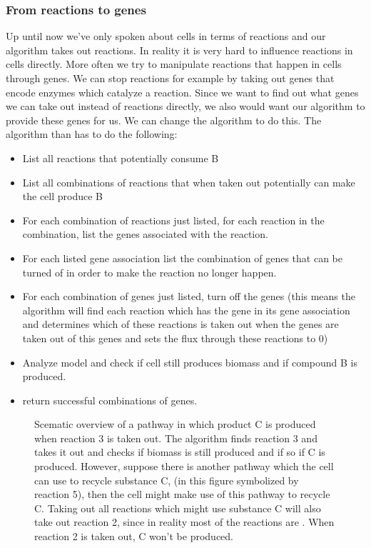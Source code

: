 \documentclass[10pt]{report}
\begin{document}
\subsubsection{From reactions to genes}
Up until now we've only spoken about cells in terms of reactions and our algorithm takes out reactions. In reality it is very hard to influence reactions in cells directly. More often we try to manipulate reactions that happen in cells through genes. We can stop reactions for example by taking out genes that encode enzymes which catalyze a reaction. Since we want to find out what genes we can take out instead of reactions directly, we also would want our algorithm to provide these genes for us. We can change the algorithm to do this.
The algorithm than has to do the following:
\begin{itemize}
\item List all reactions that potentially consume B
\item List all combinations of reactions that when taken out potentially can make the cell produce B
\item For each combination of reactions just listed, for each reaction in the combination, list the genes associated with the reaction.
\item For each listed gene association list the combination of genes that can be turned of in order to make the reaction no longer happen.
\item For each combination of genes just listed, turn off the genes (this means the algorithm will find each reaction which has the gene in its gene association and determines which of these reactions is taken out when the genes are taken out of this genes and sets the flux through these reactions to 0)
\item Analyze model and check if cell still produces biomass and if compound B is produced.
\item return successful combinations of genes.
\end{itemize}


\begin{figure}[hbtp]
  \centering
     
      \caption{Scematic overview of a pathway in which product C is produced when reaction 3 is taken out. The algorithm finds reaction 3 and takes it out and checks if biomass is still produced and if so if C is produced. However, suppose there is another pathway which the cell can use to recycle substance C, (in this figure symbolized by reaction 5), then the cell might make use of this pathway to recycle C. Taking out all reactions which might use substance C will also take out reaction 2, since in reality most of the reactions are . When reaction 2 is taken out, C won't be produced.}
  \label{fig:reaction-overview}
\end{figure}
\end{document}
